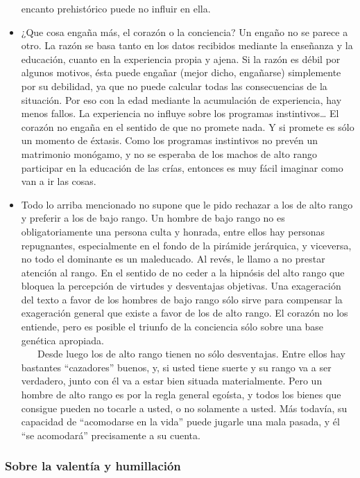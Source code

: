 \begin{itemize}
  encanto prehistórico puede no influir en ella.
\item
  ¿Que cosa engaña más, el corazón o la conciencia? Un engaño no se
  parece a otro. La razón se basa tanto en los datos recibidos mediante
  la enseñanza y la educación, cuanto en la experiencia propia y ajena.
  Si la razón es débil por algunos motivos, ésta puede engañar (mejor
  dicho, engañarse) simplemente por su debilidad, ya que no puede
  calcular todas las consecuencias de la situación. Por eso con la edad
  mediante la acumulación de experiencia, hay menos fallos. La
  experiencia no influye sobre los programas instintivos\ldots{} El
  corazón no engaña en el sentido de que no promete nada. Y si promete
  es sólo un momento de éxtasis. Como los programas instintivos no
  prevén un matrimonio monógamo, y no se esperaba de los machos de alto
  rango participar en la educación de las crías, entonces es muy fácil
  imaginar como van a ir las cosas.
\item
  Todo lo arriba mencionado no supone que le pido rechazar a los de alto
  rango y preferir a los de bajo rango. Un hombre de bajo rango no es
  obligatoriamente una persona culta y honrada, entre ellos hay personas
  repugnantes, especialmente en el fondo de la pirámide jerárquica, y
  viceversa, no todo el dominante es un maleducado. Al revés, le llamo a
  no prestar atención al rango. En el sentido de no ceder a la hipnósis
  del alto rango que bloquea la percepción de virtudes y desventajas
  objetivas. Una exageración del texto a favor de los hombres de bajo
  rango sólo sirve para compensar la exageración general que existe a
  favor de los de alto rango. El corazón no los entiende, pero es
  posible el triunfo de la conciencia sólo sobre una base genética
  apropiada.\\
  \hspace*{0.333em} ~ ~ Desde luego los de alto rango tienen no sólo
  desventajas. Entre ellos hay bastantes ``cazadores'' buenos, y, si
  usted tiene suerte y su rango va a ser verdadero, junto con él va a
  estar bien situada materialmente. Pero un hombre de alto rango es por
  la regla general egoísta, y todos los bienes que consigue pueden no
  tocarle a usted, o no solamente a usted. Más todavía, su capacidad de
  ``acomodarse en la vida'' puede jugarle una mala pasada, y él ``se
  acomodará'' precisamente a su cuenta.
\end{itemize}

\protect\hypertarget{M19}{}{}

\hypertarget{sobre-la-valentuxeda-y-humillaciuxf3n}{\subsubsection{Sobre la valentía y humillación}\label{sobre-la-valentuxeda-y-humillaciuxf3n}}

